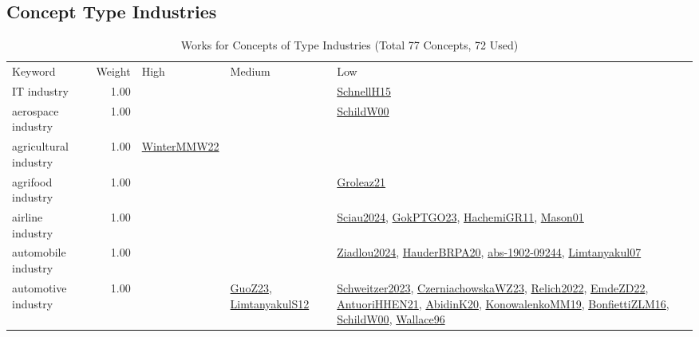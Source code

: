 \subsection{Concept Type Industries}
\label{sec:Industries}
\label{Industries}
{\scriptsize
\begin{longtable}{p{3cm}r>{\raggedright\arraybackslash}p{6cm}>{\raggedright\arraybackslash}p{6cm}>{\raggedright\arraybackslash}p{8cm}}
\rowcolor{white}\caption{Works for Concepts of Type Industries (Total 77 Concepts, 72 Used)}\\ \toprule
\rowcolor{white}Keyword & Weight & High & Medium & Low\\ \midrule\endhead
\bottomrule
\endfoot
\index{IT industry}\index{Industries!IT industry}IT industry &  1.00 &  &  & \hyperref[detail:SchnellH15]{SchnellH15}\\
\index{aerospace industry}\index{Industries!aerospace industry}aerospace industry &  1.00 &  &  & \hyperref[detail:SchildW00]{SchildW00}\\
\index{agricultural industry}\index{Industries!agricultural industry}agricultural industry &  1.00 & \hyperref[detail:WinterMMW22]{WinterMMW22} &  & \\
\index{agrifood industry}\index{Industries!agrifood industry}agrifood industry &  1.00 &  &  & \hyperref[detail:Groleaz21]{Groleaz21}\\
\index{airline industry}\index{Industries!airline industry}airline industry &  1.00 &  &  & \hyperref[detail:Sciau2024]{Sciau2024}, \hyperref[detail:GokPTGO23]{GokPTGO23}, \hyperref[detail:HachemiGR11]{HachemiGR11}, \hyperref[detail:Mason01]{Mason01}\\
\index{automobile industry}\index{Industries!automobile industry}automobile industry &  1.00 &  &  & \hyperref[detail:Ziadlou2024]{Ziadlou2024}, \hyperref[detail:HauderBRPA20]{HauderBRPA20}, \hyperref[detail:abs-1902-09244]{abs-1902-09244}, \hyperref[detail:Limtanyakul07]{Limtanyakul07}\\
\index{automotive industry}\index{Industries!automotive industry}automotive industry &  1.00 &  & \hyperref[detail:GuoZ23]{GuoZ23}, \hyperref[detail:LimtanyakulS12]{LimtanyakulS12} & \hyperref[detail:Schweitzer2023]{Schweitzer2023}, \hyperref[detail:CzerniachowskaWZ23]{CzerniachowskaWZ23}, \hyperref[detail:Relich2022]{Relich2022}, \hyperref[detail:EmdeZD22]{EmdeZD22}, \hyperref[detail:AntuoriHHEN21]{AntuoriHHEN21}, \hyperref[detail:AbidinK20]{AbidinK20}, \hyperref[detail:KonowalenkoMM19]{KonowalenkoMM19}, \hyperref[detail:BonfiettiZLM16]{BonfiettiZLM16}, \hyperref[detail:SchildW00]{SchildW00}, \hyperref[detail:Wallace96]{Wallace96}\\

\end{longtable}}

